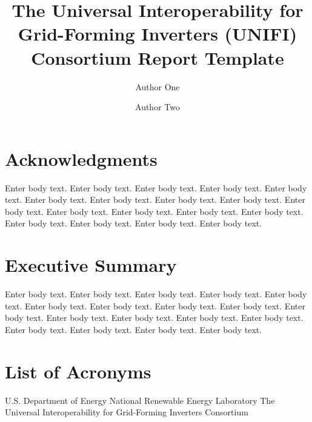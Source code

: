 \documentclass[]{nrel}
\title{The Universal Interoperability for Grid-Forming Inverters (UNIFI) Consortium Report Template}
\author{Author One} %
\author{Author Two} %
\affil{Affiliation}
\begin{document}
\frontmatter


\chapter*{Acknowledgments}
Enter body text. Enter body text. Enter body text. Enter body text. Enter body text. Enter body text. Enter body text. Enter body text. Enter body text. Enter body text. Enter body text. Enter body text. Enter body text. Enter body text. Enter body text. Enter body text. Enter body text. Enter body text.

\chapter{Executive Summary}
Enter body text. Enter body text. Enter body text. Enter body text. Enter body text. Enter body text. Enter body text. Enter body text. Enter body text. Enter body text. Enter body text. Enter body text. Enter body text. Enter body text. Enter body text. Enter body text. Enter body text. Enter body text.




\chapter*{List of Acronyms} 
\begin{acronym}[ICANN]
       {U.S. Department of Energy}
       {National Renewable Energy Laboratory}
      {The Universal Interoperability for Grid-Forming Inverters Consortium}
 \end{acronym}
\end{document}
